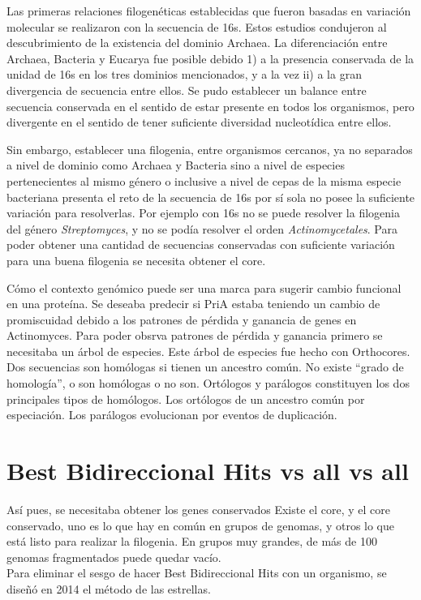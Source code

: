 \documentclass[12pt,twoside]{reedthesis}
\begin{document}
  Las primeras relaciones filogenéticas establecidas que fueron basadas en
  variación molecular se realizaron con la secuencia de 16s. Estos
  estudios condujeron al descubrimiento de la existencia del dominio
  Archaea. La diferenciación entre Archaea, Bacteria y Eucarya fue posible
  debido 1) a la presencia conservada de la unidad de 16s en los tres
  dominios mencionados, y a la vez ii) a la gran divergencia de secuencia
  entre ellos. Se pudo establecer un balance entre secuencia conservada en
  el sentido de estar presente en todos los organismos, pero divergente en
  el sentido de tener suficiente diversidad nucleotídica entre ellos.
  
  Sin embargo, establecer una filogenia, entre organismos cercanos, ya no
  separados a nivel de dominio como Archaea y Bacteria sino a nivel de
  especies pertenecientes al mismo género o inclusive a nivel de cepas de
  la misma especie bacteriana presenta el reto de la secuencia de 16s por
  sí sola no posee la suficiente variación para resolverlas. Por ejemplo
  con 16s no se puede resolver la filogenia del género
  \emph{Streptomyces}, y no se podía resolver el orden
  \emph{Actinomycetales}. Para poder obtener una cantidad de secuencias
  conservadas con suficiente variación para una buena filogenia se
  necesita obtener el core.
  
  Cómo el contexto genómico puede ser una marca para sugerir cambio
  funcional en una proteína. Se deseaba predecir si PriA estaba teniendo
  un cambio de promiscuidad debido a los patrones de pérdida y ganancia de
  genes en Actinomyces. Para poder obsrva patrones de pérdida y ganancia
  primero se necesitaba un árbol de especies. Este árbol de especies fue
  hecho con Orthocores. Dos secuencias son homólogas si tienen un ancestro
  común. No existe ``grado de homología'', o son homólogas o no son.
  Ortólogos y parálogos constituyen los dos principales tipos de
  homólogos. Los ortólogos de un ancestro común por especiación. Los
  parálogos evolucionan por eventos de duplicación.
  
  \section{Best Bidireccional Hits vs all vs
  all}\label{best-bidireccional-hits-vs-all-vs-all}
  
  Así pues, se necesitaba obtener los genes conservados Existe el core, y
  el core conservado, uno es lo que hay en común en grupos de genomas, y
  otros lo que está listo para realizar la filogenia. En grupos muy
  grandes, de más de 100 genomas fragmentados puede quedar vacío.\\
  Para eliminar el sesgo de hacer Best Bidireccional Hits con un
  organismo, se diseñó en 2014 el método de las estrellas.
  
\end{document}
